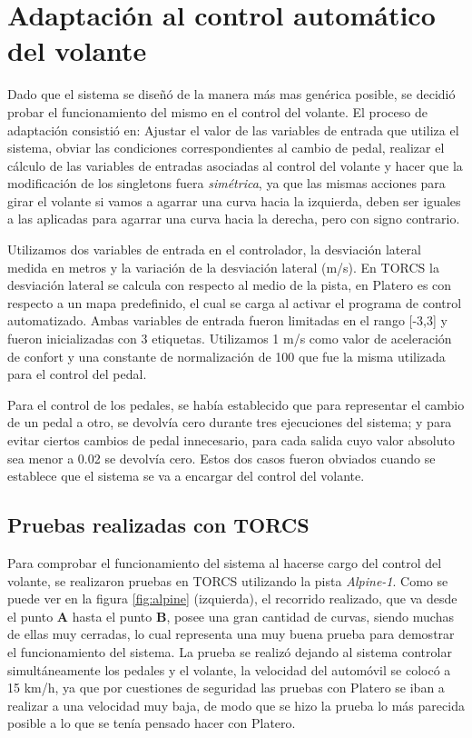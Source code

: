 \chapter{Adaptación al control automático del volante} 
\label{chap:volante}

Dado que el sistema se diseñó de la manera más mas genérica posible, se decidió probar el funcionamiento del mismo en el control del volante. El proceso de adaptación consistió en: Ajustar el valor de las variables de entrada que utiliza el sistema, obviar las condiciones correspondientes al cambio de pedal, realizar el cálculo de las variables de entradas asociadas al control del volante y hacer que la modificación de los singletons fuera \textit{simétrica}, ya que las mismas acciones para girar el volante si vamos a agarrar una curva hacia la izquierda, deben ser iguales a las aplicadas para agarrar una curva hacia la derecha, pero con signo contrario.

Utilizamos dos variables de entrada en el controlador, la desviación lateral medida en metros y la variación de la desviación lateral (m/s). En \gls{TORCS} la desviación lateral se calcula con respecto al medio de la pista, en Platero es con respecto a un mapa predefinido, el cual se carga al activar el programa de control automatizado. Ambas variables de entrada fueron limitadas en el rango [-3,3] y fueron inicializadas con 3 etiquetas. Utilizamos 1 m/s como valor de aceleración de confort y una constante de normalización de 100 que fue la misma utilizada para el control del pedal. 

Para el control de los pedales, se había establecido que para representar el cambio de un pedal a otro, se devolvía cero durante tres ejecuciones del sistema; y para evitar ciertos cambios de pedal innecesario, para cada salida cuyo valor absoluto sea menor a 0.02 se devolvía cero. Estos dos casos fueron obviados cuando se establece que el sistema se va a encargar del control del volante.

\section{Pruebas realizadas con TORCS}

Para comprobar el funcionamiento del sistema al hacerse cargo del control del volante, se realizaron pruebas en \gls{TORCS} utilizando la pista \textit{Alpine-1}. Como se puede ver en la figura \ref{fig:alpine} (izquierda), el recorrido realizado, que va desde el punto \textbf{A} hasta el punto \textbf{B}, posee una gran cantidad de curvas, siendo muchas de ellas muy cerradas, lo cual representa una muy buena prueba para demostrar el funcionamiento del sistema. La prueba se realizó dejando al sistema controlar simultáneamente los pedales y el volante, la velocidad del automóvil se colocó a 15 km/h, ya que por cuestiones de seguridad las pruebas con Platero se iban a realizar a una velocidad muy baja, de modo que se hizo la prueba lo más parecida posible a lo que se tenía pensado hacer con Platero.  


